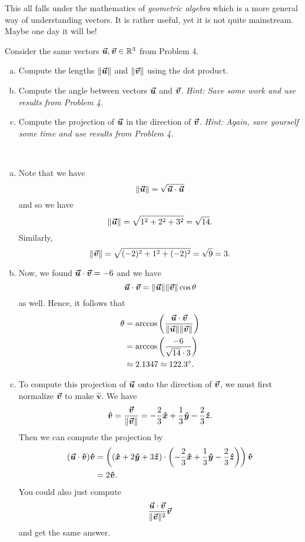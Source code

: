 \documentclass[12pt]{article} %
\begin{document}
\begin{solution}
\begin{remark}
This all falls under the mathematics of \emph{geometric algebra} which is a more general way of understanding vectors.  It is rather useful, yet it is not quite mainstream.  Maybe one day it will be!
\end{remark}

\end{solution}

\newpage
\begin{problem}
Consider the same vectors $\boldsymbol{\vec{u}},\boldsymbol{\vec{v}}\in \mathbb{R}^3$ from Problem 4.  
\begin{enumerate}[(a)]
    \item Compute the lengths $\|\boldsymbol{\vec{u}}\|$ and $\|\boldsymbol{\vec{v}}\|$ using the dot product.
    \item Compute the angle between vectors $\boldsymbol{\vec{u}}$ and $\boldsymbol{\vec{v}}$. \emph{Hint: Save some work and use results from Problem 4.}
    \item Compute the projection of $\boldsymbol{\vec{u}}$ in the direction of $\boldsymbol{\vec{v}}$. \emph{Hint: Again, save yourself some time and use results from Problem 4.}
\end{enumerate}
\end{problem}
\begin{solution}~
\begin{enumerate}[(a)]
    \item Note that we have
    \[
    \|\boldsymbol{\vec{u}} \| = \sqrt{ \boldsymbol{\vec{u}} \cdot \boldsymbol{\vec{u}}}
    \]
    and so we have
    \[
    \|\boldsymbol{\vec{u}} \| = \sqrt{1^2+2^2+3^2} = \sqrt{14}.
    \]
    Similarly,
    \[
    \|\boldsymbol{\vec{v}}\| = \sqrt{(-2)^2+1^2+(-2)^2} = \sqrt{9}=3.
    \]
    \item Now, we found $\boldsymbol{\vec{u}}\cdot \boldsymbol{\vec{v}} = -6$ and we have
    \[
    \boldsymbol{\vec{u}} \cdot \boldsymbol{\vec{v}} = \|\boldsymbol{\vec{u}}\|\|\boldsymbol{\vec{v}} \| \cos \theta
    \]
    as well. Hence, it follows that
    \begin{align*}
        \theta &= \arccos\left(\frac{\boldsymbol{\vec{u}} \cdot \boldsymbol{\vec{v}}}{\|\boldsymbol{\vec{u}}\|\|\boldsymbol{\vec{v}}\|}\right)\\
        &= \arccos\left(\frac{-6}{\sqrt{14}\cdot 3}\right)\\
        &\approx  2.1347 \approx 122.3^\circ.
    \end{align*}
    \item To compute this projection of $\boldsymbol{\vec{u}}$ onto the direction of $\boldsymbol{\vec{v}}$, we must first normalize $\boldsymbol{\vec{v}}$ to make $\boldsymbol{\hat{v}}$. We have
    \[
    \boldsymbol{\hat{v}} = \frac{\boldsymbol{\vec{v}}}{\|\boldsymbol{\vec{v}}\|} = -\frac{2}{3}\boldsymbol{\hat{x}} + \frac{1}{3}\boldsymbol{\hat{y}} - \frac{2}{3}\boldsymbol{\hat{z}}.
    \]
    Then we can compute the projection by
    \begin{align*}
        (\boldsymbol{\vec{u}} \cdot \boldsymbol{\hat{v}})\boldsymbol{\hat{v}}&= \left((\boldsymbol{\hat{x}} + 2\boldsymbol{\hat{y}} + 3\boldsymbol{\hat{z}} ) \cdot \left( -\frac{2}{3}\boldsymbol{\hat{x}} + \frac{1}{3}\boldsymbol{\hat{y}} - \frac{2}{3}\boldsymbol{\hat{z}}\right)\right) \boldsymbol{\hat{v}} \\
        &= 2\boldsymbol{\hat{v}}.
    \end{align*}
    You could also just compute
    \[
    \frac{\boldsymbol{\vec{u}} \cdot \boldsymbol{\vec{v}}}{\|\boldsymbol{\vec{v}}\|^2}\boldsymbol{\vec{v}}
    \]
    and get the same answer.
\end{enumerate}
\end{solution}
\end{document}
